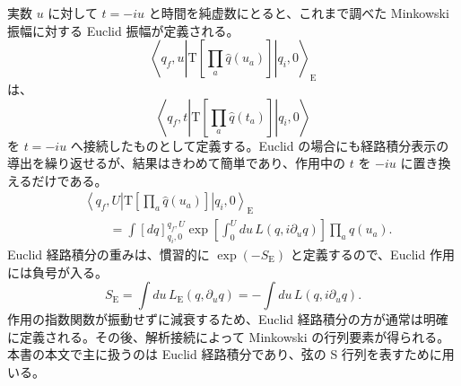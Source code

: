実数 $u$ に対して $t=-iu$ と時間を純虚数にとると、これまで調べた Minkowski 振幅に対する Euclid 振幅が定義される。
\begin{equation}
\left\langle q_f,u\left|
\mathrm T\left[\prod_a\hat q(u_a)\right]\right|q_i,0\right\rangle_{\mathrm E}
\tag{A.1.28}\label{eq:A.1.28}
\end{equation}
は、
\begin{equation}
\left\langle q_f,t\left|
\mathrm T\left[\prod_a\hat q(t_a)\right]\right|q_i,0\right\rangle
\tag{A.1.29}\label{eq:A.1.29}
\end{equation}
を $t=-iu$ へ接続したものとして定義する。Euclid の場合にも経路積分表示の導出を繰り返せるが、結果はきわめて簡単であり、作用中の $t$ を $-iu$ に置き換えるだけである。
\begin{equation}
\begin{aligned}
&\left\langle q_f,U\left|
\mathrm T\left[\prod_a\hat q(u_a)\right]\right|q_i,0\right\rangle_{\mathrm E}\\
&\qquad=\int[dq]_{q_i,0}^{q_f,U}
\exp\left[\int_0^Udu\,L(q,i\partial_uq)\right]\prod_aq(u_a).
\end{aligned}
\tag{A.1.30}\label{eq:A.1.30}
\end{equation}
Euclid 経路積分の重みは、慣習的に $\exp(-S_{\mathrm E})$ と定義するので、Euclid 作用には負号が入る。
\begin{equation}
S_{\mathrm E}=\int du\,L_{\mathrm E}(q,\partial_uq)
=-\int du\,L(q,i\partial_uq).
\tag{A.1.31}\label{eq:A.1.31}
\end{equation}
作用の指数関数が振動せずに減衰するため、Euclid 経路積分の方が通常は明確に定義される。その後、解析接続によって Minkowski の行列要素が得られる。本書の本文で主に扱うのは Euclid 経路積分であり、弦の S 行列を表すために用いる。

